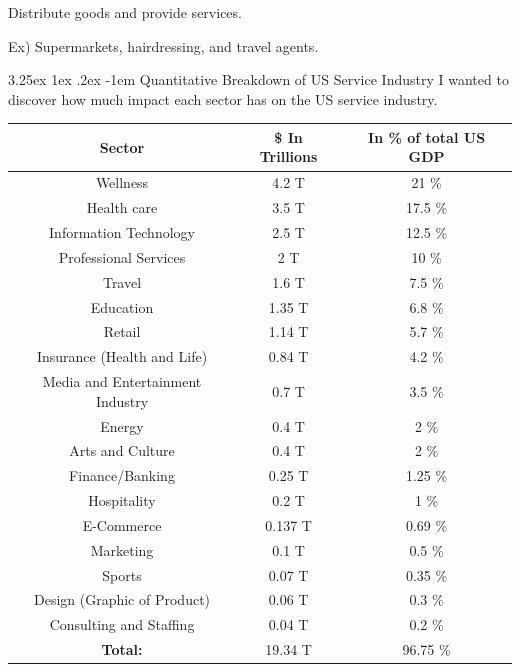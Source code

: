 \documentclass{article}
\makeatletter
\newcounter{subsubsubsection}[subsubsection]
\renewcommand\subparagraph{\@startsection{subparagraph}{6}{\parindent}%
  {3.25ex \@plus1ex \@minus .2ex}%
  {-1em}%
  {\normalfont\normalsize\bfseries}}
\makeatother
\begin{document}
\newpage

Distribute goods and provide services. 

Ex) Supermarkets, hairdressing, and travel agents. 

\newpage

\subparagraph{Quantitative Breakdown of US Service Industry}
I wanted to discover how much impact each sector has on the US service industry.

\begin{center}
 \begin{tabular}{||c c c||} 
 \hline
 \textbf{Sector} & \textbf{\$ In Trillions} & \textbf{In \% of total US GDP} \\ [0.5ex] 
 \hline\hline
 Wellness & 4.2 T & 21 \% \\ [1ex] 
 \hline
 Health care & 3.5 T & 17.5 \% \\ [1ex] 
 \hline
 Information Technology & 2.5 T & 12.5 \% \\ 
 \hline
 Professional Services & 2 T & 10 \% \\ [1ex] 
 \hline
 Travel & 1.6 T & 7.5 \% \\
 \hline 
 Education & 1.35 T & 6.8 \% \\ [1ex] 
 \hline
 Retail & 1.14 T & 5.7 \% \\ [1ex] 
 \hline
 Insurance (Health and Life) & 0.84 T & 4.2 \% \\ [1ex] 
 \hline
 Media and Entertainment Industry & 0.7 T & 3.5 \%  \\
 \hline
 Energy & 0.4 T & 2 \% \\ [1ex] 
 \hline
 Arts and Culture & 0.4 T & 2 \% \\ [1ex] 
 \hline
 Finance/Banking & 0.25 T & 1.25 \% \\ [1ex] 
 \hline
 Hospitality & 0.2 T & 1 \% \\
 \hline
 E-Commerce & 0.137 T & 0.69 \% \\ [1ex] 
 \hline
 Marketing & 0.1 T & 0.5 \% \\ [1ex] 
 \hline
 Sports & 0.07 T & 0.35 \% \\ [1ex] 
 \hline
 Design (Graphic of Product) & 0.06 T & 0.3 \% \\ [1ex] 
 \hline
 Consulting and Staffing & 0.04 T & 0.2 \% \\ [1ex] 
 \hline
 \hline 
 \textbf{Total:} & 19.34 T & 96.75 \% \\ [1ex] 
 \hline
 \hline
\end{tabular}
\end{center}
\end{document}
